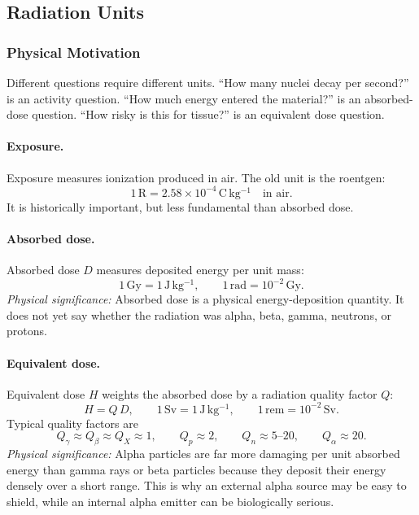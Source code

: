 \subsection{Radiation Units}
\label{subsec:lec05:radiation_units}

\subsubsection*{Physical Motivation}
Different questions require different units.  ``How many nuclei decay per
second?'' is an activity question.  ``How much energy entered the material?'' is
an absorbed-dose question.  ``How risky is this for tissue?'' is an equivalent
dose question.

\paragraph{Exposure.}
Exposure measures ionization produced in air.  The old unit is the roentgen:
\begin{equation}
  \label{eq:lec05:roentgen}
  \boxed{1\,\mathrm{R}=2.58\times10^{-4}\,\mathrm{C\,kg^{-1}}
  \quad\text{in air}.}
\end{equation}
It is historically important, but less fundamental than absorbed dose.

\paragraph{Absorbed dose.}
Absorbed dose \(D\) measures deposited energy per unit mass:
\begin{equation}
  \label{eq:lec05:gray}
  \boxed{1\,\mathrm{Gy}=1\,\mathrm{J\,kg^{-1}},\qquad
  1\,\mathrm{rad}=10^{-2}\,\mathrm{Gy}.}
\end{equation}
\textit{Physical significance:} Absorbed dose is a physical energy-deposition
quantity.  It does not yet say whether the radiation was alpha, beta, gamma,
neutrons, or protons.

\paragraph{Equivalent dose.}
Equivalent dose \(H\) weights the absorbed dose by a radiation quality factor
\(Q\):
\begin{equation}
  \label{eq:lec05:equivalent_dose}
  \boxed{H=Q\,D,\qquad 1\,\mathrm{Sv}=1\,\mathrm{J\,kg^{-1}},\qquad
  1\,\mathrm{rem}=10^{-2}\,\mathrm{Sv}.}
\end{equation}
Typical quality factors are
\begin{equation}
  \label{eq:lec05:quality_factors}
  \boxed{
  Q_{\gamma}\approx Q_{\beta}\approx Q_{X}\approx1,\qquad
  Q_p\approx2,\qquad
  Q_n\approx5\text{--}20,\qquad
  Q_{\alpha}\approx20.}
\end{equation}
\textit{Physical significance:} Alpha particles are far more damaging per unit
absorbed energy than gamma rays or beta particles because they deposit their
energy densely over a short range.  This is why an external alpha source may be
easy to shield, while an internal alpha emitter can be biologically serious.

